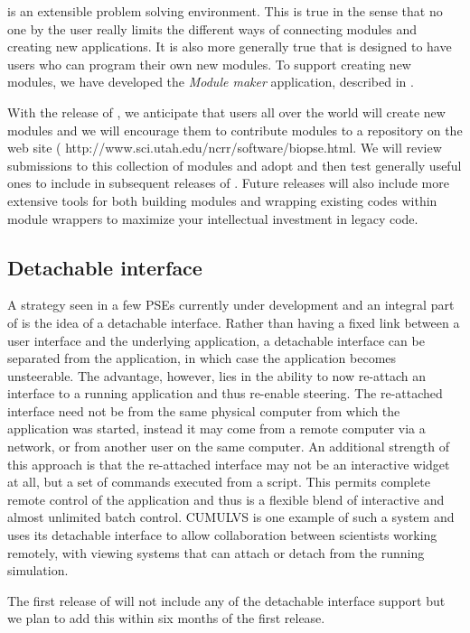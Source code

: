 \SR{} is an extensible  problem solving environment.
This is true in the sense that no one by the user really limits the
different ways of connecting modules and creating new applications.  It is
also more generally true that \SR{} is designed to have users who can
program  their own new modules.  To support creating new modules, we
have developed the \emph{Module maker} application, described in 
.

With the release of \SR{}, we anticipate that users all over the world will
create new modules and we will encourage them to contribute modules to a
repository on the \PSE{} web site 
(
{http://www.sci.utah.edu/ncrr/software/biopse.html}.  We will review
submissions to this collection of modules and adopt and then test generally
useful ones to include in subsequent releases of \PSE{}.  Future releases
will also include more extensive tools for both building modules and
wrapping existing codes within \SR{} module wrappers to maximize your
intellectual investment in legacy code.


\subsection{Detachable interface}
\label{sec:con-detach} 

A strategy seen in a few PSEs currently under development and an integral
part of \SR{} is the idea of a detachable interface.  Rather than having a
fixed link between a user interface and the underlying application, a
detachable interface can be separated from the application, in which case
the application becomes unsteerable.  The advantage, however, lies in the
ability to now re-attach an interface to a running application and thus
re-enable steering.  The re-attached interface need not be from the same
physical computer from which the application was started, instead it may
come from a remote computer via a network, or from another user on the same
computer.  An additional strength of this approach is that the re-attached
interface may not be an interactive widget at all, but a set of commands
executed from a script.  This permits complete remote control of the
application and thus is a flexible blend of interactive and almost
unlimited batch control.  CUMULVS  is one example of such a
system and uses its detachable interface to allow collaboration between
scientists working remotely, with viewing systems that can attach or detach
from the running simulation.

The first release of \SR{} will not include any of the detachable interface
support but we plan to add this within six months of the first release.

